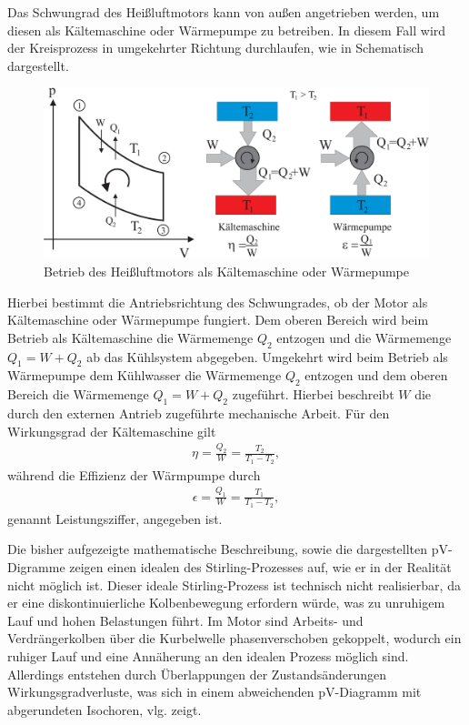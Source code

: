 Das Schwungrad des Heißluftmotors kann von außen angetrieben werden, um diesen als Kältemaschine oder Wärmepumpe zu betreiben. In diesem Fall wird der Kreisprozess in umgekehrter Richtung durchlaufen, wie in  Schematisch dargestellt.

\begin{figure}[H]
  \centering
  \includegraphics[width=.65\textwidth]{files/reverse_process_pv.png}
  \caption{Betrieb des Heißluftmotors als Kältemaschine oder Wärmepumpe}
  \label{fig:reverse_process_pv}
\end{figure}

Hierbei bestimmt die Antriebsrichtung des Schwungrades, ob der Motor als Kältemaschine oder Wärmepumpe fungiert. Dem oberen Bereich wird beim Betrieb als Kältemaschine die Wärmemenge $Q_2$ entzogen und die Wärmemenge $Q_1 = W + Q_2$ ab das Kühlsystem abgegeben. Umgekehrt wird beim Betrieb als Wärmepumpe dem Kühlwasser die Wärmemenge $Q_2$ entzogen und dem oberen Bereich die Wärmemenge $Q_1 = W + Q_2$ zugeführt. Hierbei beschreibt $W$ die durch den externen Antrieb zugeführte mechanische Arbeit. Für den Wirkungsgrad der Kältemaschine gilt
\begin{align}
  \eta = \frac{Q_2}{W} = \frac{T_2}{T_1 - T_2},
\end{align}
während die Effizienz der Wärmpumpe durch
\begin{align}
  \epsilon = \frac{Q_1}{W} = \frac{T_1}{T_1 - T_2},
\end{align}
genannt Leistungsziffer, angegeben ist.

Die bisher aufgezeigte mathematische Beschreibung, sowie die dargestellten pV-Digramme zeigen einen idealen des Stirling-Prozesses auf, wie er in der Realität nicht möglich ist. Dieser ideale Stirling-Prozess ist technisch nicht realisierbar, da er eine diskontinuierliche Kolbenbewegung erfordern würde, was zu unruhigem Lauf und hohen Belastungen führt. Im Motor sind Arbeits- und Verdrängerkolben über die Kurbelwelle phasenverschoben gekoppelt, wodurch ein ruhiger Lauf und eine Annäherung an den idealen Prozess möglich sind. Allerdings entstehen durch Überlappungen der Zustandsänderungen Wirkungsgradverluste, was sich in einem abweichenden pV-Diagramm mit abgerundeten Isochoren, vlg.  zeigt.

